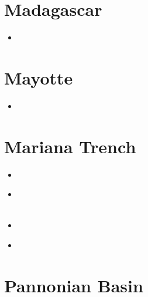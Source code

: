\section{Madagascar}

\begin{small}
\begin{itemize}
\item[\twothousandtwenty]
\end{itemize}
\end{small}

\section{Mayotte}

\begin{small}
\begin{itemize}
\item[\twothousandtwentyfour]
\end{itemize}
\end{small}


\section{Mariana Trench}

\begin{small}
\begin{itemize}
\item[\nineteenninetytwo]
\item[\twothousandfifteen]
\\
\\
\item[\twothousandeighteen]
\item[\twothousandtwentythree]
\\
\end{itemize}
\end{small}

\section{Pannonian Basin}

